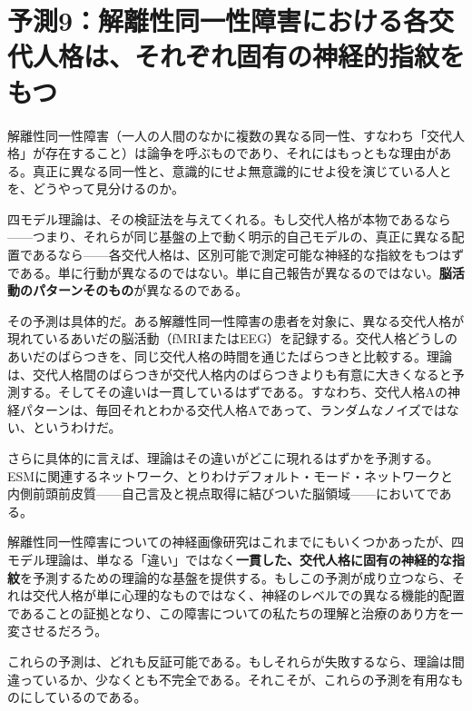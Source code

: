 \documentclass[11pt, twoside, openright]{book}
\begin{document}
\section*{予測9：解離性同一性障害における各交代人格は、それぞれ固有の神経的指紋をもつ}

解離性同一性障害（一人の人間のなかに複数の異なる同一性、すなわち「交代人格」が存在すること）は論争を呼ぶものであり、それにはもっともな理由がある。真正に異なる同一性と、意識的にせよ無意識的にせよ役を演じている人とを、どうやって見分けるのか。

四モデル理論は、その検証法を与えてくれる。もし交代人格が本物であるなら------つまり、それらが同じ基盤の上で動く明示的自己モデルの、真正に異なる配置であるなら------各交代人格は、区別可能で測定可能な神経的な指紋をもつはずである。単に行動が異なるのではない。単に自己報告が異なるのではない。\textbf{脳活動のパターンそのもの}が異なるのである。

その予測は具体的だ。ある解離性同一性障害の患者を対象に、異なる交代人格が現れているあいだの脳活動（fMRIまたはEEG）を記録する。交代人格どうしのあいだのばらつきを、同じ交代人格の時間を通じたばらつきと比較する。理論は、交代人格間のばらつきが交代人格内のばらつきよりも有意に大きくなると予測する。そしてその違いは一貫しているはずである。すなわち、交代人格Aの神経パターンは、毎回それとわかる交代人格Aであって、ランダムなノイズではない、というわけだ。

さらに具体的に言えば、理論はその違いがどこに現れるはずかを予測する。ESMに関連するネットワーク、とりわけデフォルト・モード・ネットワークと内側前頭前皮質------自己言及と視点取得に結びついた脳領域------においてである。

解離性同一性障害についての神経画像研究はこれまでにもいくつかあったが、四モデル理論は、単なる「違い」ではなく\textbf{一貫した、交代人格に固有の神経的な指紋}を予測するための理論的な基盤を提供する。もしこの予測が成り立つなら、それは交代人格が単に心理的なものではなく、神経のレベルでの異なる機能的配置であることの証拠となり、この障害についての私たちの理解と治療のあり方を一変させるだろう。

これらの予測は、どれも反証可能である。もしそれらが失敗するなら、理論は間違っているか、少なくとも不完全である。それこそが、これらの予測を有用なものにしているのである。
\end{document}
